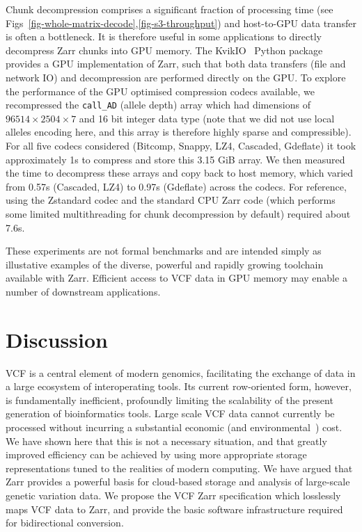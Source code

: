 \documentclass[a4paper,num-refs]{oup-contemporary}
\begin{document}
Chunk decompression comprises a significant fraction of processing
time (see Figs~\ref{fig-whole-matrix-decode},\ref{fig-s3-throughput})
and host-to-GPU data transfer is
often a bottleneck. It is therefore useful in some applications
to directly decompress Zarr chunks into GPU memory.
The KvikIO~\cite{kvikio} Python package provides a GPU 
implementation of Zarr, such that both data transfers
(file and network IO) and decompression are performed 
directly on the GPU. 
To explore the performance of the GPU optimised compression
codecs available, we recompressed
the \texttt{call\_AD} (allele depth) array
which had dimensions of $96514\times2504\times7$
and 16 bit integer data type (note that 
we did not use local alleles encoding here, and this 
array is therefore highly sparse and compressible).
For all five codecs considered
(Bitcomp, Snappy, LZ4, Cascaded, Gdeflate)
it took approximately 1s
to compress and store this 3.15 GiB array. 
We then measured the time to decompress these arrays and
copy back to host memory,
which varied from 0.57s (Cascaded, LZ4) to 0.97s (Gdeflate) across
the codecs.
For reference, using the Zstandard codec and the
standard CPU Zarr code (which performs some limited multithreading for 
chunk decompression by default) required about 7.6s. 

These experiments are not formal benchmarks and are intended simply 
as illustative examples of the diverse, powerful and rapidly
growing toolchain available with Zarr. Efficient access to VCF 
data in GPU memory may enable a number of downstream applications.

\section{Discussion}
VCF is a central element of modern genomics, facilitating
the exchange of data in a large ecosystem of interoperating tools.
Its current row-oriented form, however,
is fundamentally inefficient,
profoundly limiting the scalability of the present generation
of bioinformatics tools. Large scale VCF data cannot
currently be
processed without incurring a substantial economic
(and environmental~\cite{grealey2022carbon}) cost.
We have shown here that this is not a necessary situation,
and that greatly improved efficiency can be achieved by
using more appropriate storage representations tuned
to the realities of modern computing. We have argued that
Zarr provides a powerful basis for cloud-based
storage and analysis of large-scale genetic variation data.
We propose the VCF Zarr specification which losslessly
maps VCF data to Zarr, and provide the basic software
infrastructure required for bidirectional conversion.
\end{document}
